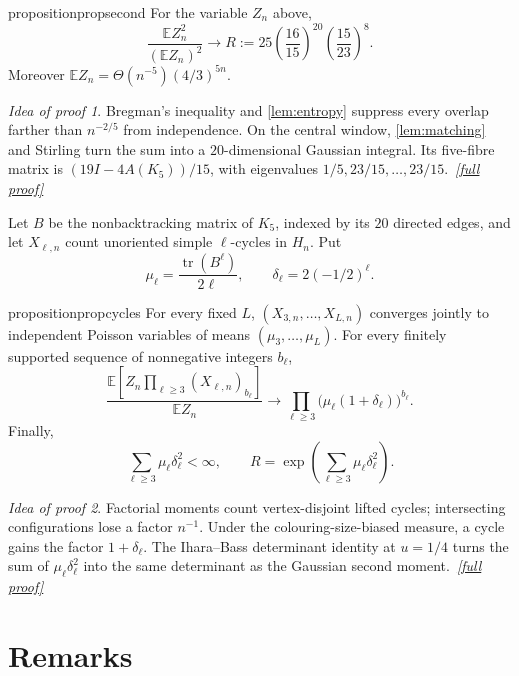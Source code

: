 \documentclass[11pt,a4paper]{article}
\theoremstyle{plain}
\theoremstyle{definition}
\theoremstyle{remark}
\newtheorem*{proofidea}{Idea of proof}
\newcommand{\fullproofref}[1]{\,\hyperref[#1]{\textit{[full proof]}}}
\newcommand{\E}{\mathbb E}
\newcommand{\tr}{\operatorname{tr}}
\begin{document}
\begin{restatable}{proposition}{propsecond}\label{prop:second}
For the variable $Z_n$ above,
\[
 \frac{\E Z_n^2}{(\E Z_n)^2}\longrightarrow
 R:=25\left(\frac{16}{15}\right)^{20}\left(\frac{15}{23}\right)^8.
\]
Moreover $\E Z_n=\Theta(n^{-5})(4/3)^{5n}$.
\end{restatable}
\begin{proofidea}
Bregman's inequality and \cref{lem:entropy} suppress every overlap farther than
$n^{-2/5}$ from independence.  On the central window, \cref{lem:matching} and Stirling
turn the sum into a $20$-dimensional Gaussian integral.  Its five-fibre matrix is
$(19I-4A(K_5))/15$, with eigenvalues $1/5,23/15,\ldots,23/15$.
\fullproofref{pf:second}
\end{proofidea}

Let $B$ be the nonbacktracking matrix of $K_5$, indexed by its $20$ directed edges,
and let $X_{\ell,n}$ count unoriented simple $\ell$-cycles in $H_n$.  Put
\[
 \mu_\ell=\frac{\tr(B^\ell)}{2\ell},\qquad
 \delta_\ell=2(-1/2)^\ell.                                    \tag{4}
\]

\begin{restatable}{proposition}{propcycles}\label{prop:cycles}
For every fixed $L$, $(X_{3,n},\ldots,X_{L,n})$ converges jointly to independent
Poisson variables of means $(\mu_3,\ldots,\mu_L)$.  For every finitely supported
sequence of nonnegative integers $b_\ell$,
\[
 \frac{\E\left[Z_n\prod_{\ell\ge3}(X_{\ell,n})_{b_\ell}\right]}{\E Z_n}
 \longrightarrow
 \prod_{\ell\ge3}\bigl(\mu_\ell(1+\delta_\ell)\bigr)^{b_\ell}.
\]
Finally,
\[
 \sum_{\ell\ge3}\mu_\ell\delta_\ell^2<\infty,
 \qquad
 R=\exp\left(\sum_{\ell\ge3}\mu_\ell\delta_\ell^2\right).
\]
\end{restatable}
\begin{proofidea}
Factorial moments count vertex-disjoint lifted cycles; intersecting configurations lose
a factor $n^{-1}$.  Under the colouring-size-biased measure, a cycle gains the factor
$1+\delta_\ell$.  The Ihara--Bass determinant identity at $u=1/4$ turns the sum of
$\mu_\ell\delta_\ell^2$ into the same determinant as the Gaussian second moment.
\fullproofref{pf:cycles}
\end{proofidea}

\section{Remarks}
\end{document}
